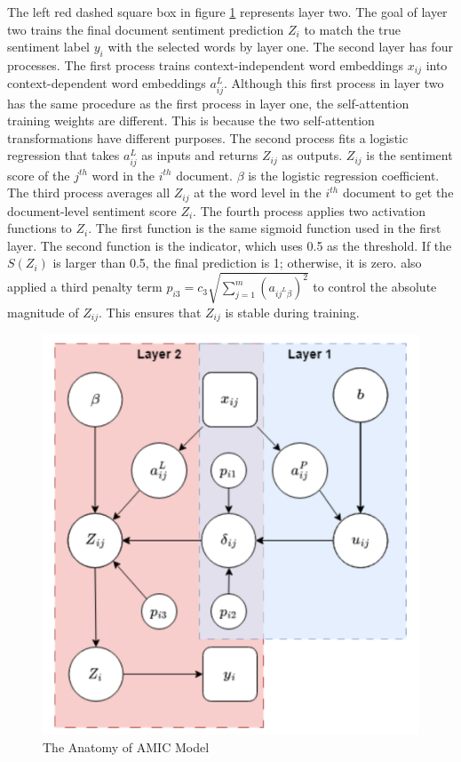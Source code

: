 \documentclass[aoas]{imsart}
\numberwithin{equation}{section}
\theoremstyle{plain}
\theoremstyle{remark}
\begin{document}
The left red dashed square box in figure \ref{Fig6: amic} represents layer two. The goal of layer two trains the final document sentiment prediction $Z_{i}$ to match the true sentiment label $y_i$ with the selected words by layer one. The second layer has four processes. The first process trains context-independent word embeddings $x_{ij}$ into context-dependent word embeddings $a_{ij}^L$. Although this first process in layer two has the same procedure as the first process in layer one, the self-attention training weights are different. This is because the two self-attention transformations have different purposes. The second process fits a logistic regression that takes $a_{ij}^L$ as inputs and returns $Z_{ij}$ as outputs. $Z_{ij}$ is the sentiment score of the $j^{th}$ word in the $i^{th}$ document. $\beta$ is the logistic regression coefficient. The third process averages all $Z_{ij}$ at the word level in the $i^{th}$ document to get the document-level sentiment score $Z_{i}$. The fourth process applies two activation functions to $Z_{i}$. The first function is the same sigmoid function used in the first layer. The second function is the indicator, which uses 0.5 as the threshold. If the $S(Z_i)$ is larger than 0.5, the final prediction is 1; otherwise, it is zero. \cite{chenyu} also applied a third penalty term $p_{i3}=c_3\sqrt{\sum_{j=1}^m(a_{ij^L\beta})^2}$ to control the absolute magnitude of $Z_{ij}$. This ensures that $Z_{ij}$ is stable during training.
\begin{figure}[ht]
\includegraphics[scale=0.4]{img/amic.png}
\caption{The Anatomy of AMIC Model}
\label{Fig6: amic}
\end{figure}
\end{document}
